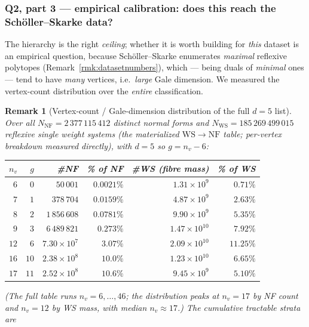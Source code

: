 \documentclass{amsart}
\newtheorem{remark}[theorem]{Remark}
\begin{document}
\subsubsection*{Q2, part 3 --- empirical calibration: does this reach the
Sch\"oller--Skarke data?}

The hierarchy is the right \emph{ceiling}; whether it is worth building for
\emph{this} dataset is an empirical question, because Sch\"oller--Skarke
enumerates \emph{maximal} reflexive polytopes (Remark~\ref{rmk:datasetnumbers}),
which --- being duals of \emph{minimal} ones --- tend to have \emph{many}
vertices, i.e.\ \emph{large} Gale dimension. We measured the vertex-count
distribution over the \emph{entire} classification.

\begin{remark}[Vertex-count / Gale-dimension distribution of the full $d=5$
list]\label{rmk:galecalib}
Over all $N_{\mathrm{NF}}=2\,377\,115\,412$ distinct normal forms and
$N_{\mathrm{WS}}=185\,269\,499\,015$ reflexive single weight systems (the
materialized $\mathrm{WS}\to\mathrm{NF}$ table; per-vertex breakdown measured
directly), with $d=5$ so $g=n_v-6$:
\begin{center}\small
\begin{tabular}{r r r r r r}
\hline
$n_v$ & $g$ & \#NF & \% of NF & \#WS (fibre mass) & \% of WS \\
\hline
$6$  & $0$ & $50\,001$        & $0.0021\%$ & $1.31\times10^{9}$ & $0.71\%$ \\
$7$  & $1$ & $378\,704$       & $0.0159\%$ & $4.87\times10^{9}$ & $2.63\%$ \\
$8$  & $2$ & $1\,856\,608$    & $0.0781\%$ & $9.90\times10^{9}$ & $5.35\%$ \\
$9$  & $3$ & $6\,489\,821$    & $0.273\%$  & $1.47\times10^{10}$& $7.92\%$ \\
$12$ & $6$ & $7.30\times10^{7}$& $3.07\%$  & $2.09\times10^{10}$& $11.25\%$ \\
$16$ & $10$& $2.38\times10^{8}$& $10.0\%$  & $1.23\times10^{10}$& $6.65\%$ \\
$17$ & $11$& $2.52\times10^{8}$& $10.6\%$  & $9.45\times10^{9}$ & $5.10\%$ \\
\hline
\end{tabular}
\end{center}
(The full table runs $n_v=6,\dots,46$; the distribution peaks at $n_v=17$ by NF
count and $n_v=12$ by WS mass, with median $n_v\approx17$.) The cumulative
tractable strata are
\begin{center}\small
\begin{tabular}{l r r}

\end{tabular}
\end{center}
\end{remark}
\end{document}
